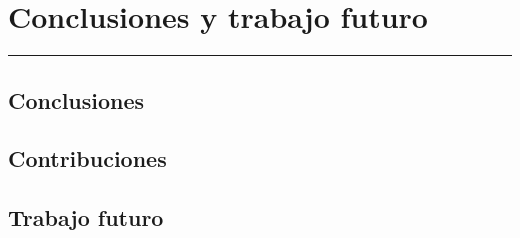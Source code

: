 \chapter{Conclusiones y trabajo futuro}
\hrule \bigskip \vspace*{1cm}

\section{Conclusiones}

\section{Contribuciones}

\section{Trabajo futuro}
